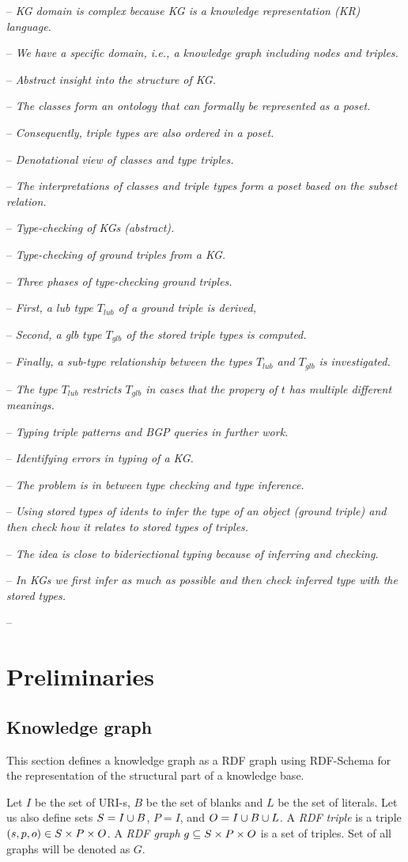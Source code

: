 \documentclass[runningheads]{llncs}
\newcommand{\notes}[1]{\noindent\begin{small}-- \emph{#1}\\\end{small}}
\begin{document}
\notes{KG domain is complex because KG is a knowledge representation (KR) language.}
\notes{We have a specific domain, i.e., a knowledge graph including nodes and triples.}
\notes{Abstract insight into the structure of KG.}
\notes{The classes form an ontology that can formally be represented as a poset.}
\notes{Consequently, triple types are also ordered in a poset.}
\notes{Denotational view of classes and type triples.}
\notes{The interpretations of classes and triple types form a poset based on the subset relation.}

\notes{Type-checking of KGs (abstract).}
\notes{Type-checking of ground triples from a KG.}
\notes{Three phases of type-checking ground triples.}
\notes{First, a lub type $T_{lub}$ of a ground triple is derived,}
\notes{Second, a glb type $T_{glb}$ of the stored triple types is computed.}
\notes{Finally, a sub-type relationship between the types $T_{lub}$ and $T_{glb}$ is investigated.}
\notes{The type $T_{lub}$ restricts $T_{glb}$ in cases that the propery of $t$ has multiple different meanings.}
\notes{Typing triple patterns and BGP queries in further work.}
\notes{Identifying errors in typing of a KG.}

\notes{The problem is in between type checking and type inference.}
\notes{Using stored types of idents to infer the type of an object (ground triple) and then check how it relates to stored types of triples. }
\notes{The idea is close to bideriectional typing \cite{Dunfield2021} because of inferring and checking.}
\notes{In KGs we first infer as much as possible and then check inferred type with the stored types.}
\notes{}






\section{Preliminaries}


\subsection{Knowledge graph\label{section:kg}}

This section defines a knowledge graph as a RDF graph \cite{rdf} using
RDF-Schema \cite{rdfschema} for the representation of the structural
part of a knowledge base. 

Let $I$ be the set of URI-s, $B$ be the set of blanks and $L$ be the
set of literals. Let us also define sets $S = I\cup\/B$, $P = I$, and
$O = I\cup\/B\cup\/L$. A \emph{RDF triple} is a triple
$(s,p,o)\in\/S\times\/P\times\/O$. A \emph{RDF graph}
$g\subseteq\/S\times\/P\times\/O$ is a set of triples. Set of all
graphs will be denoted as $G$.
\end{document}
